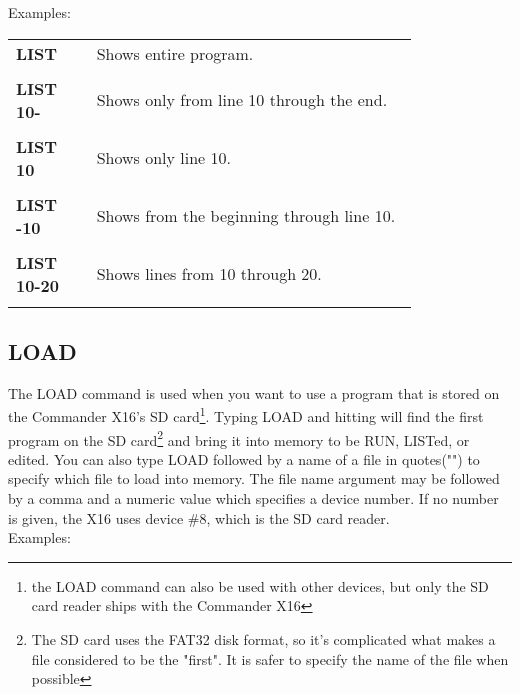Examples:\\

\begin{tabular}{l p{0.8\linewidth}}
	{\ttfamily\bfseries LIST}&Shows entire program.\\\\
	{\ttfamily\bfseries LIST 10-}&Shows only from line 10 through the end.\\\\
	{\ttfamily\bfseries LIST 10}&Shows only line 10.\\\\
	{\ttfamily\bfseries LIST -10}&Shows from the beginning through line 10.\\\\
	{\ttfamily\bfseries LIST 10-20}&Shows lines from 10 through 20.\\\\
\end{tabular}

\vspace{16pt}

\subsection{LOAD}

The {\ttfamily LOAD} command is used when you want to use a program that is
stored on the Commander X16's SD card\footnote{the {\ttfamily LOAD} command can
also be used with other devices, but only the SD card reader ships with the
Commander X16}.  Typing {\ttfamily LOAD} and hitting  will find
the first program on the SD card\footnote{The SD card uses the FAT32 disk
format, so it's complicated what makes a file considered to be the "first".  It
is safer to specify the name of the file when possible} and bring it into
memory to be {\ttfamily RUN}, {\ttfamily LIST}ed, or edited.  You can also type
{\ttfamily LOAD} followed by a name of a file in quotes({\ttfamily ""}) to
specify which file to load into memory.  The file name argument may be followed
by a comma and a numeric value which specifies a device number.  If no number
is given, the X16 uses device \#8, which is the SD card reader.\\

Examples:\\

